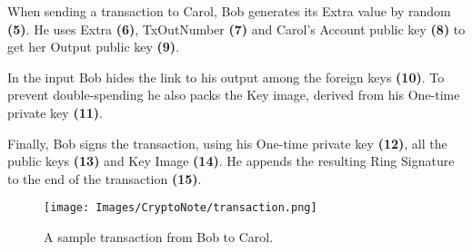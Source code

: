 When sending a transaction to Carol, Bob generates its Extra value by random \textbf{(5)}. He uses Extra \textbf{(6)}, TxOutNumber \textbf{(7)} and Carol's Account public key \textbf{(8)} to get her Output public key \textbf{(9)}.

In the input Bob hides the link to his output among the foreign keys \textbf{(10)}. To prevent double-spending he also packs the Key image, derived from his One-time private key \textbf{(11)}.

Finally, Bob signs the transaction, using his One-time private key \textbf{(12)}, all the public keys \textbf{(13)} and Key Image \textbf{(14)}. He appends the resulting Ring Signature to the end of the transaction \textbf{(15)}.
\clearpage
\pagebreak

\begin{figure}[ht]
  \centering
  \texttt{[image: Images/CryptoNote/transaction.png]}
  \caption{A sample transaction from Bob to Carol.~\cite{cryptonote}}
  \label{fig:transaction}
\end{figure}
